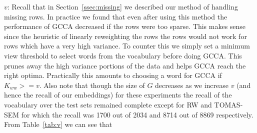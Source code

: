 \documentclass[11pt]{article}
\begin{document}
$v$: Recall that in Section~\ref{ssec:missing} we described our method
  of handling missing rows. In practice we found that even after using
  this method the performance of GCCA decreased if the rows were too
  sparse. This makes sense since the heuristic of linearly reweighting
  the rows the rows would not work for rows which have a very high
  variance. To counter this we simply set a minimum view threshold
  to select words from the vocabulary before doing GCCA. This
  prunes away the high variance portions of the data and
  helps GCCA reach the right optima. Practically this amounts to
  choosing a word for GCCA if $K_{ww} >= v$. Also note that though the
  size of $G$ decreases as we increase $v$ (and hence the recall of
  our embeddings) for these experiments the recall of the vocabulary
  over the test sets remained complete except for RW and TOMAS-SEM for
  which the recall was 1700 out of 2034 and 8714 out of 8869
  respectively. From Table~\ref{tab:v} we can see that
\end{document}
